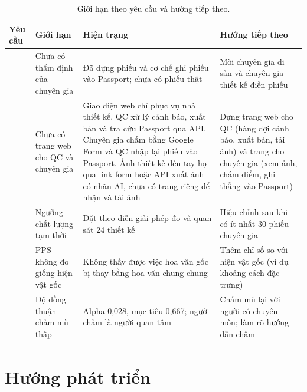\documentclass[12pt,a4paper]{report}
\begin{document}
\begin{table}[H]
\centering
\small
\caption{Giới hạn theo yêu cầu và hướng tiếp theo.}
\label{tab:gioihan}
\begin{tabularx}{\textwidth}{>{\raggedright\arraybackslash}p{1.3cm}>{\raggedright\arraybackslash}p{3.6cm}>{\raggedright\arraybackslash}X>{\raggedright\arraybackslash}p{4.0cm}}
\toprule
\textbf{Yêu cầu} & \textbf{Giới hạn} & \textbf{Hiện trạng} & \textbf{Hướng tiếp theo} \\
\midrule
1 & Chưa có thẩm định của chuyên gia & Đã dựng phiếu và cơ chế ghi phiếu vào Passport; chưa có phiếu thật & Mời chuyên gia di sản và chuyên gia thiết kế điền phiếu \\
\addlinespace
1 & Chưa có trang web cho QC và chuyên gia & Giao diện web chỉ phục vụ nhà thiết kế. QC xử lý cảnh báo, xuất bản và tra cứu Passport qua API. Chuyên gia chấm bằng Google Form và QC nhập lại phiếu vào Passport. Ảnh thiết kế đến tay họ qua link form hoặc API xuất ảnh có nhãn AI, chưa có trang riêng để nhận và tải ảnh & Dựng trang web cho QC (hàng đợi cảnh báo, xuất bản, tải ảnh) và trang cho chuyên gia (xem ảnh, chấm điểm, ghi thẳng vào Passport) \\
\addlinespace
1 & Ngưỡng chất lượng tạm thời & Đặt theo diễn giải phép đo và quan sát 24 thiết kế & Hiệu chỉnh sau khi có ít nhất 30 phiếu chuyên gia \\
\addlinespace
1 & PPS không đo giống hiện vật gốc & Không thấy được việc hoa văn gốc bị thay bằng hoa văn chung chung & Thêm chỉ số so với hiện vật gốc (ví dụ khoảng cách đặc trưng) \\
\addlinespace
2 & Độ đồng thuận chấm mù thấp & Alpha 0,028, mục tiêu 0,667; người chấm là người quan tâm & Chấm mù lại với người có chuyên môn; làm rõ hướng dẫn chấm \\
\bottomrule
\end{tabularx}
\end{table}

\section{Hướng phát triển}
\end{document}
